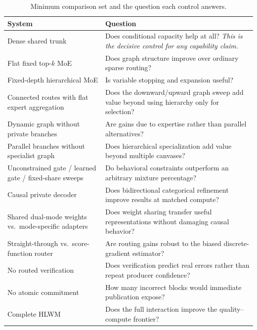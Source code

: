 \documentclass[10pt,a4paper]{article}
\begin{document}
\begin{table}[htbp]
\caption{Minimum comparison set and the question each control answers.}
\label{tab:baselines}
\centering\small
\begin{tabularx}{\textwidth}{@{}lX@{}}
\toprule
\textbf{System} & \textbf{Question} \\
\midrule
Dense shared trunk & Does conditional capacity help at all? \emph{This is the decisive control for any capability claim.} \\
Flat fixed top-$k$ MoE & Does graph structure improve over ordinary sparse routing? \\
Fixed-depth hierarchical MoE & Is variable stopping and expansion useful? \\
Connected routes with flat expert aggregation & Does the downward/upward graph sweep add value beyond using hierarchy only for selection? \\
Dynamic graph without private branches & Are gains due to expertise rather than parallel alternatives? \\
Parallel branches without specialist graph & Does hierarchical specialization add value beyond multiple canvases? \\
Unconstrained gate / learned gate / fixed-share sweeps & Do behavioral constraints outperform an arbitrary mixture percentage? \\
Causal private decoder & Does bidirectional categorical refinement improve results at matched compute? \\
Shared dual-mode weights vs.\ mode-specific adapters & Does weight sharing transfer useful representations without damaging causal behavior? \\
Straight-through vs.\ score-function router & Are routing gains robust to the biased discrete-gradient estimator? \\
No routed verification & Does verification predict real errors rather than repeat producer confidence? \\
No atomic commitment & How many incorrect blocks would immediate publication expose? \\
Complete HLWM & Does the full interaction improve the quality--compute frontier? \\
\bottomrule
\end{tabularx}
\end{table}
\end{document}
